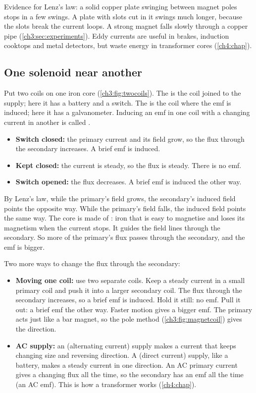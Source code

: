 Evidence for Lenz's law: a solid copper plate swinging between magnet poles stops
in a few swings. A plate with slots cut in it swings much longer, because the
slots break the current loops. A strong magnet falls slowly through a copper pipe
(\cref{ch3:sec:experiments}). Eddy currents are useful in brakes, induction
cooktops and metal detectors, but waste energy in transformer cores (\cref{ch4:chap}).

\subsection{One solenoid near another}

Put two coils on one iron core (\cref{ch3:fig:twocoils}). The 
is the coil joined to the supply; here it has a battery and a switch. The
 is the coil where the emf is induced; here it has a
galvanometer. Inducing an emf in one coil with a changing current in another is
called .
\begin{itemize}
  \item \textbf{Switch closed:} the primary current and its field grow, so the flux
        through the secondary increases. A brief emf is induced.
  \item \textbf{Kept closed:} the current is steady, so the flux is steady. There
        is no emf.
  \item \textbf{Switch opened:} the flux decreases. A brief emf is induced the
        other way.
\end{itemize}

By Lenz's law, while the primary's field grows, the secondary's induced field
points the opposite way. While the primary's field falls, the induced field
points the same way. The core is made of : iron that is easy to
magnetise and loses its magnetism when the current stops. It guides the field
lines through the secondary. So more of the primary's flux passes through the
secondary, and the emf is bigger.

Two more ways to change the flux through the secondary:
\begin{itemize}
  \item \textbf{Moving one coil:} use two separate coils. Keep a steady current in
        a small primary coil and push it into a larger secondary coil. The flux
        through the secondary increases, so a brief emf is induced. Hold it
        still: no emf. Pull it out: a brief emf the other way. Faster motion
        gives a bigger emf. The primary acts just like a bar magnet, so the pole
        method (\cref{ch3:fig:magnetcoil}) gives the direction.
  \item \textbf{AC supply:} an  (alternating current) supply makes a
        current that keeps changing size and reversing direction. A 
        (direct current) supply, like a battery, makes a steady current in one
        direction. An AC primary current gives a changing flux all the time, so
        the secondary has an emf all the time (an AC emf). This is how a
        transformer works (\cref{ch4:chap}).
\end{itemize}

